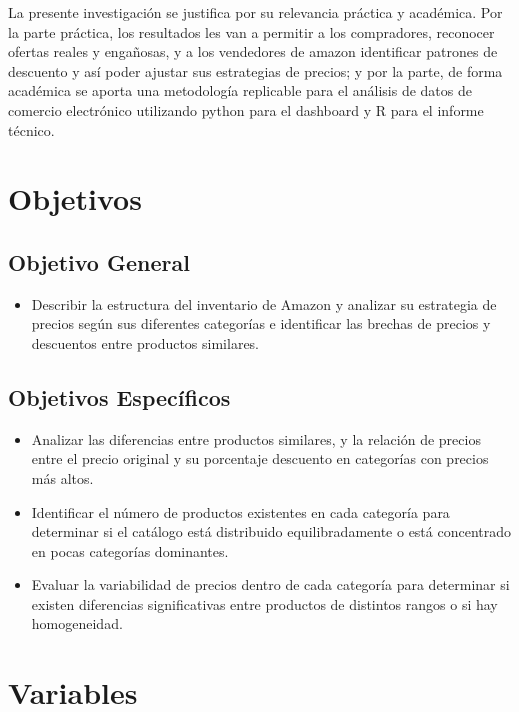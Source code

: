 \documentclass[oneside,11pt]{Latex/Classes/PhDthesisPSnPDF}
\begin{document}
La presente investigación se justifica por su relevancia práctica y
académica. Por la parte práctica, los resultados les van a permitir a
los compradores, reconocer ofertas reales y engañosas, y a los
vendedores de amazon identificar patrones de descuento y así poder
ajustar sus estrategias de precios; y por la parte, de forma académica
se aporta una metodología replicable para el análisis de datos de
comercio electrónico utilizando python para el dashboard y R para el
informe técnico.\\

\section{Objetivos}

\subsection{Objetivo General}
\begin{itemize}
  \item{Describir la estructura del inventario de Amazon y analizar su estrategia de precios según sus diferentes categorías e identificar las brechas de precios y descuentos entre productos similares.}
\end{itemize}

\subsection{Objetivos Específicos}
\begin{itemize}
  \item{Analizar las diferencias entre productos similares, y la relación de precios entre el precio original y su porcentaje descuento en categorías con precios más altos.}
  \item{Identificar el número de productos existentes en cada categoría para determinar si el catálogo está distribuido equilibradamente o está concentrado en pocas categorías dominantes.}
  \item{Evaluar  la variabilidad de precios dentro de cada categoría para determinar si existen diferencias significativas entre productos de distintos rangos o si hay homogeneidad.}
\end{itemize}

\section{Variables}
\end{document}
